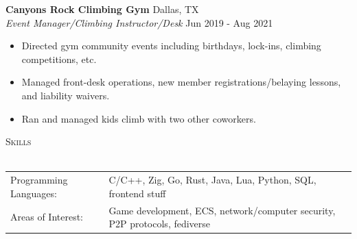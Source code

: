 \documentclass[a4paper]{article}
\newcommand{\lineunder} {
    \vspace*{-8pt} \\
    \hspace*{-18pt} \hrulefill \\
}
\newcommand{\header} [1] {
    {\hspace*{-18pt}\vspace*{6pt} \textsc{#1}}
    \vspace*{-6pt} \lineunder
}
\begin{document}
\textbf{Canyons Rock Climbing Gym} \hfill Dallas, TX\\
\textit{Event Manager/Climbing Instructor/Desk} \hfill Jun 2019 - Aug 2021\\
\begin{itemize} \itemsep 1pt
	\item Directed gym community events including birthdays, lock-ins, climbing competitions, etc.
	\item Managed front-desk operations, new member registrations/belaying lessons, and liability waivers.
	\item Ran and managed kids climb with two other coworkers.
\end{itemize}
\header{Skills}
\vspace{1mm}
\begin{tabular}{ l l }
	Programming Languages: & C/C++, Zig, Go, Rust, Java, Lua, Python, SQL, frontend stuff\\
    Areas of Interest: & Game development, ECS, network/computer security, P2P protocols, fediverse
\end{tabular}\\
\end{document}
